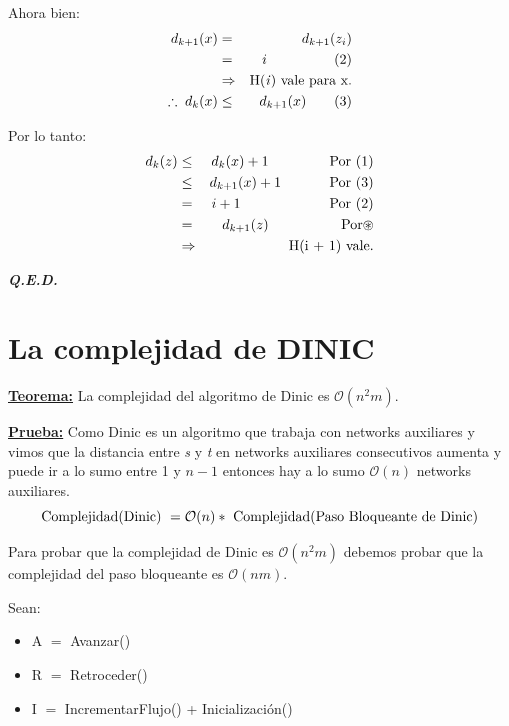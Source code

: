 \documentclass[12pt,a4paper]{report}
\newcommand{\QED}{\hfill \textit{\textbf{Q.E.D.}}}
\begin{document}
\begin{enumerate}
  				\par Ahora bien:
  				\begin{eqnarray}
  					\nonumber d_{k + 1}(x) &=& d_{k + 1}(z_{i}) \\
  					\nonumber &=& i \qquad \qquad \; \; \; (2) \\
  					\nonumber &\Rightarrow & \textup{H(\textit{i}) vale para x.} \\
  					\nonumber \therefore \; d_{k}(x) & \leq & d_{k + 1}(x) \qquad (3)
  				\end{eqnarray}

  				\par Por lo tanto:
  				\begin{eqnarray}
  					\nonumber d_{k}(z) &\leq & d_{k}(x) + 1 \qquad \qquad \textup{ Por } (1) \\
  					\nonumber &\leq & d_{k + 1}(x) + 1 \qquad \; \; \; \; \textup{ Por (3)} \\
  					\nonumber &=& i + 1 \qquad \qquad \qquad \textup{ Por } (2) \\
  					\nonumber &=& d_{k + 1}(z) \qquad \qquad \; \; \; \textup{ Por} \circledast \\
  					\nonumber & \Rightarrow & \textup{H(i + 1) vale.}
  				\end{eqnarray}
  			\end{enumerate}

  		\QED

  	\pagebreak
  	\section{La complejidad de DINIC}
  		\textbf{\underline{Teorema:}} La complejidad del algoritmo de Dinic es $\mathcal{O}(n^{2}m)$.

  		\textbf{\underline{Prueba:}} Como Dinic es un algoritmo que trabaja con networks auxiliares y vimos que la distancia entre \textit{s} y \textit{t} en networks auxiliares consecutivos aumenta y puede ir a lo sumo entre 1 y $n - 1$ entonces hay a lo sumo $\mathcal{O}(n)$ networks auxiliares.
  			\[ \textup{Complejidad(Dinic) } = \mathcal{O}(n) * \textup{ Complejidad(Paso Bloqueante de Dinic)} \]
  			\par Para probar que la complejidad de Dinic es $\mathcal{O}(n^{2}m)$ debemos probar que la complejidad del paso bloqueante es $\mathcal{O}(nm)$.
  			\par Sean:
  			\begin{itemize}
  				\item A $=$ Avanzar()
  				\item R $=$ Retroceder()
  				\item I $=$ IncrementarFlujo() + Inicialización()
  			\end{itemize}
\end{document}

